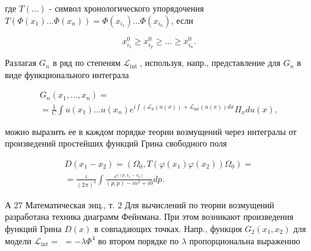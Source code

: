 \documentclass[10pt]{article}
\begin{document}
где $T(\ldots)$ - символ хронологического упорядочения $T\left(\Phi\left(x_{1}\right) \ldots \Phi\left(x_{n}\right)\right)=\Phi\left(x_{i_{1}}\right) \ldots \Phi\left(x_{i_{n}}\right)$, если



\[

x_{i_{1}}^{0} \geqslant x_{i_{2}}^{0} \geqslant \ldots \geqslant x_{i_{n}}^{0} .

\]



Разлагая $G_{n}$ в ряд по степеням $\mathscr{L}_{\text {int }}$, используя, напр., представление для $G_{n}$ в виде функционального интеграла



\[

\begin{gathered}

G_{n}\left(x_{1}, \ldots, x_{n}\right)= \\

=\frac{1}{C} \int u\left(x_{1}\right) \ldots u\left(x_{n}\right) e^{i \int\left(\mathscr{L}_{0}(u(x))+\mathscr{L}_{\mathrm{int}}(u(x)) d x\right.} \Pi_{x} d u(x),

\end{gathered}

\]



можно выразить ее в каждом порядке теории возмущений через интегралы от произведений простейших функций Грина свободного поля



\[

\begin{gathered}

D\left(x_{1}-x_{2}\right)=\left(\Omega_{0}, T\left(\varphi\left(x_{1}\right) \varphi\left(x_{2}\right)\right) \Omega_{0}\right)= \\

=\frac{i}{(2 \pi)^{4}} \int \frac{e^{i\left(p, x_{1}-x_{2}\right)}}{(p, p)-m^{2}+i 0} d p .

\end{gathered}

\]



А 27 Математическая энц., т. 2 Для вычислений по теории возмущений разработана техника диаграмм Фейнмана. При этом возникают произведения функций Грина $D(x)$ в совпадающих точках. Напр., функция $G_{2}\left(x_{1}, x_{2}\right)$ для модели $\mathscr{L}_{\mathrm{int}}=$ $=-\lambda \Phi^{4}$ во втором порядке по $\lambda$ пропорциональна выражению
\end{document}
